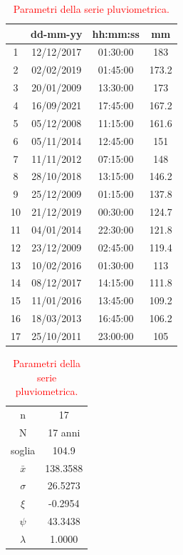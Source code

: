 \begin{table}[H]
    \caption*{Evento pluviometrico di 720 minuti.}
    \begin{minipage}{.5\linewidth}
      \caption{\textcolor{red}{Campione della serie pluviometrica.}}
      \centering
        \begin{tabular}{cccc}
            \toprule
            & dd-mm-yy   & hh:mm:ss & mm  \\
         \midrule
         1  & 12/12/2017 & 01:30:00 & 183   \\
         2  & 02/02/2019 & 01:45:00 & 173.2 \\
         3  & 20/01/2009 & 13:30:00 & 173   \\
         4  & 16/09/2021 & 17:45:00 & 167.2 \\
         5  & 05/12/2008 & 11:15:00 & 161.6 \\
         6  & 05/11/2014 & 12:45:00 & 151   \\
         7  & 11/11/2012 & 07:15:00 & 148   \\
         8  & 28/10/2018 & 13:15:00 & 146.2 \\
         9  & 25/12/2009 & 01:15:00 & 137.8 \\
         10 & 21/12/2019 & 00:30:00 & 124.7 \\
         11 & 04/01/2014 & 22:30:00 & 121.8 \\
         12 & 23/12/2009 & 02:45:00 & 119.4 \\
         13 & 10/02/2016 & 01:30:00 & 113   \\
         14 & 08/12/2017 & 14:15:00 & 111.8 \\
         15 & 11/01/2016 & 13:45:00 & 109.2 \\
         16 & 18/03/2013 & 16:45:00 & 106.2 \\
         17 & 25/10/2011 & 23:00:00 & 105   \\
         \bottomrule
        \end{tabular}
    \end{minipage}%
    \begin{minipage}{.5\linewidth}
      \centering
        \caption{\textcolor{red}{Parametri della serie pluviometrica.}}
        \begin{tabular}{cc}
            \toprule
            n        &   17      \\
            N        & 17 anni \\
            soglia   &     104.9    \\
            $\bar{x}$ &    138.3588    \\
            $\sigma$ &      26.5273   \\
            $\xi$      &     -0.2954  \\
            $\psi$      &    43.3438 \\
            $\lambda$   &   1.0000 \\
        \bottomrule     
        \end{tabular}
    \end{minipage} 
\end{table}

